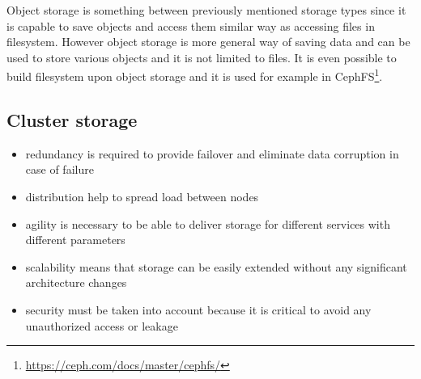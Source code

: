 Object storage is something between previously mentioned storage types since it is capable to save objects and access them similar way as accessing files in filesystem. However object storage is more general way of saving data and can be used to store various objects and it is not limited to files. It is even possible to build filesystem upon object storage and it is used for example in CephFS\footnote{\url{https://ceph.com/docs/master/cephfs/}}.


\subsection{Cluster storage}


\begin{itemize}
	\item redundancy is required to provide failover and eliminate data corruption in case of failure 
	\item distribution help to spread load between nodes
	\item agility is necessary to be able to deliver storage for different services with different parameters
	\item scalability means that storage can be easily extended without any significant architecture changes
	\item security must be taken into account because it is critical to avoid any unauthorized access or leakage
\end{itemize}

% 







